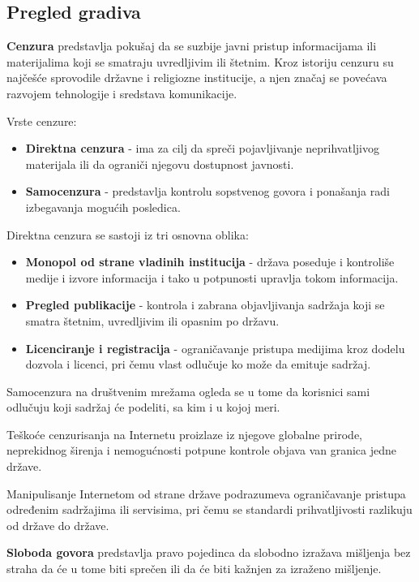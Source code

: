 \documentclass[a4paper, 12pt]{article}
\begin{document}
\subsection{Pregled gradiva}
\textbf{Cenzura} predstavlja pokušaj da se suzbije javni pristup informacijama ili
materijalima koji se smatraju uvredljivim ili štetnim. 
Kroz istoriju cenzuru su najčešće sprovodile državne i religiozne institucije, a njen značaj 
se povećava razvojem tehnologije i sredstava komunikacije.

Vrste cenzure:
\begin{itemize}
    \item \textbf{Direktna cenzura} - ima za cilj da spreči pojavljivanje neprihvatljivog
    materijala ili da ograniči njegovu dostupnost javnosti.
    \item \textbf{Samocenzura} - predstavlja kontrolu sopstvenog govora i ponašanja radi
    izbegavanja mogućih posledica.
\end{itemize}

Direktna cenzura se sastoji iz tri osnovna oblika:
\begin{itemize}
    \item \textbf{Monopol od strane vladinih institucija} - država poseduje i kontroliše
    medije i izvore informacija i tako u potpunosti upravlja tokom informacija.
    \item \textbf{Pregled publikacije} - kontrola i zabrana objavljivanja sadržaja koji
    se smatra štetnim, uvredljivim ili opasnim po državu.
    \item \textbf{Licenciranje i registracija} - ograničavanje pristupa medijima kroz
    dodelu dozvola i licenci, pri čemu vlast odlučuje ko može da emituje sadržaj.
\end{itemize}

Samocenzura na društvenim mrežama ogleda se u tome da korisnici sami odlučuju
koji sadržaj će podeliti, sa kim i u kojoj meri.

Teškoće cenzurisanja na Internetu proizlaze iz njegove globalne prirode,
neprekidnog širenja i nemogućnosti potpune kontrole objava van granica jedne
države.

Manipulisanje Internetom od strane države podrazumeva ograničavanje pristupa
određenim sadržajima ili servisima, pri čemu se standardi prihvatljivosti
razlikuju od države do države.


\vspace{\baselineskip}

\textbf{Sloboda govora} predstavlja pravo pojedinca da slobodno izražava mišljenja bez straha da će u tome biti sprečen ili da će biti kažnjen za izraženo mišljenje.
\end{document}
